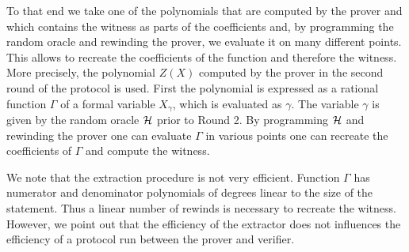 \documentclass[runningheads,11pt]{llncs}
\theoremstyle{definition}
\begin{document}
To that end we take one of the polynomials that are computed by the prover and which contains the witness as parts of the coefficients and, by programming the random oracle and rewinding the prover, we evaluate it on many different points. This allows to recreate the coefficients of the function and therefore the witness.
%
More precisely, the polynomial $Z(X)$ computed by the prover in the second round of the protocol is used. First the polynomial is expressed as a rational function $\Gamma$ of a formal variable $X_\gamma$, which is evaluated as $\gamma$.
The variable $\gamma$ is given by the random oracle $\mathcal{H}$ prior to Round 2.
By programming $\mathcal{H}$ and rewinding the prover one can evaluate $\Gamma$ in various points one can recreate the coefficients of $\Gamma$ and compute the witness.

We note that the extraction procedure is not very efficient. Function $\Gamma$ has numerator and denominator polynomials of degrees linear to the size of the statement. Thus a linear number of rewinds is necessary to recreate the witness.
However, we point out that the efficiency of the extractor does not influences the efficiency of a protocol run between the prover and verifier.
\end{document}
